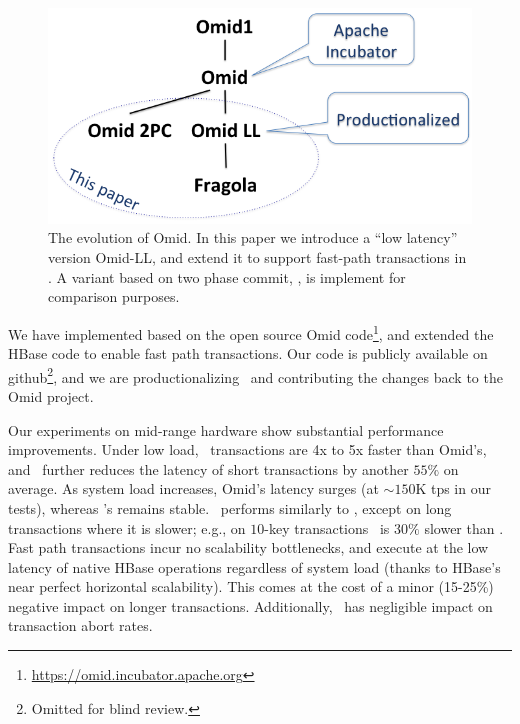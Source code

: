 \begin{figure}
\centerline{
\includegraphics[width=0.80\columnwidth]{figs/OmidEvolution}
}
\caption{The evolution of Omid. In this paper we introduce a ``low latency'' version Omid-LL, and extend it to support fast-path transactions in \sys.
A variant based on two phase commit, \syspc, is implement for comparison purposes.}
\label{fig:evolution}
\end{figure}

We have implemented {\sys\/} %
based on the open source Omid code\footnote{\url{https://omid.incubator.apache.org}}, 
and extended the HBase code to enable fast path 
transactions. %
Our code is publicly available on github\footnote{\small{Omitted for blind review.}},
and we are productionalizing \sysll\ and contributing the changes back to the Omid project.
 
Our experiments on mid-range hardware show substantial performance improvements.
Under low load, \sysll\ transactions are 4x to 5x faster than Omid's, 
and \sys\ further reduces the latency of short transactions by another $55\%$ on average.
As system load increases, Omid's latency surges (at  $\sim\!\!\!150$K tps in our tests),  
whereas \sys's remains stable. \syspc\ performs similarly to \sysll, except on long transactions
where it is slower; e.g., on $10$-key transactions \syspc\ is $30\%$ slower than \sysll.
Fast path transactions incur no scalability
bottlenecks, and execute at the low latency of native HBase operations regardless of system load
(thanks to HBase's near perfect horizontal scalability).
This comes at the cost of a minor (15-25\%) negative impact on longer transactions. 
Additionally, \sys\ has negligible impact on  transaction abort rates.

